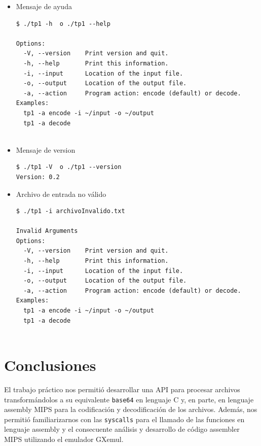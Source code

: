 \documentclass[11pt,a4paper]{article}
\begin{document}
\begin{itemize}
    \item Mensaje de ayuda\\
    
\begin{lstlisting}
$ ./tp1 -h  o ./tp1 --help

Options:
  -V, --version    Print version and quit.
  -h, --help       Print this information.
  -i, --input      Location of the input file.
  -o, --output     Location of the output file.
  -a, --action     Program action: encode (default) or decode.
Examples:
  tp1 -a encode -i ~/input -o ~/output
  tp1 -a decode


\end{lstlisting}     
     
	\item Mensaje de version\\

            \begin{lstlisting}
$ ./tp1 -V  o ./tp1 --version
Version: 0.2
             \end{lstlisting}  
         
         
    \item Archivo de entrada no válido
            \begin{lstlisting}
$ ./tp1 -i archivoInvalido.txt

Invalid Arguments
Options:
  -V, --version    Print version and quit.
  -h, --help       Print this information.
  -i, --input      Location of the input file.
  -o, --output     Location of the output file.
  -a, --action     Program action: encode (default) or decode.
Examples:
  tp1 -a encode -i ~/input -o ~/output
  tp1 -a decode


             \end{lstlisting}  

\end{itemize}


\newpage

\section{Conclusiones}

El trabajo práctico nos permitió desarrollar una API para procesar archivos transformándolos a su equivalente \texttt{base64} en lenguaje C y, en parte, en lenguaje assembly MIPS para la codificación y decodificación de los archivos. Además, nos permitió familiarizarnos con las \texttt{syscalls} para el llamado de las funciones en lenguaje assembly y el consecuente análisis y desarrollo de código assembler MIPS utilizando el emulador GXemul.
\end{document}
